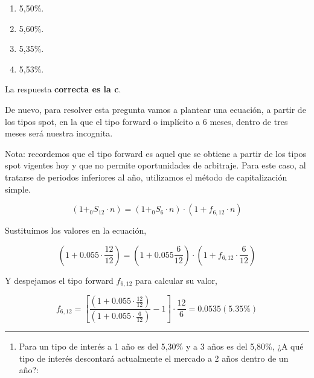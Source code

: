 \documentclass[
  letterpaper,
  DIV=11,
  numbers=noendperiod]{scrreprt}
\providecommand{\tightlist}{%
  \setlength{\itemsep}{0pt}\setlength{\parskip}{0pt}}\usepackage{longtable,booktabs,array}
\begin{document}
\begin{enumerate}
\def\labelenumi{\alph{enumi}.}
\item
  5,50\%.
\item
  5,60\%.
\item
  5,35\%.
\item
  5,53\%.
\end{enumerate}

\begin{tcolorbox}[enhanced jigsaw, left=2mm, opacityback=0, colback=white, breakable, arc=.35mm, bottomrule=.15mm, rightrule=.15mm, toprule=.15mm, leftrule=.75mm, colframe=quarto-callout-tip-color-frame]
\begin{minipage}[t]{5.5mm}
\textcolor{quarto-callout-tip-color}{\faLightbulb}
\end{minipage}%
\begin{minipage}[t]{\textwidth - 5.5mm}

La respuesta \textbf{correcta es la c}.

De nuevo, para resolver esta pregunta vamos a plantear una ecuación, a
partir de los tipos spot, en la que el tipo forward o implícito a 6
meses, dentro de tres meses será nuestra incognita.

Nota: recordemos que el tipo forward es aquel que se obtiene a partir de
los tipos spot vigentes hoy y que no permite oportunidades de arbitraje.
Para este caso, al tratarse de periodos inferiores al año, utilizamos el
método de capitalización simple.

\[(1+_{0}S_{12} \cdot {n})=(1+_{0}S_{6} \cdot n)\cdot(1+f_{6,12}\cdot {n})\]

Sustituimos los valores en la ecuación,

\[(1+0.055\cdot \frac{12}{12})=(1+0.055\frac{6}{12})\cdot(1+f_{6,12}\cdot \frac{6}{12})\]

Y despejamos el tipo forward \(f_{6,12}\) para calcular su valor,

\[f_{6,12}=\left[\frac{(1+0.055\cdot \frac{12}{12})}{(1+0.055\cdot \frac{6}{12})}-1\right]\cdot\frac{ 12}{6}=0.0535(5.35\%)\]

\end{minipage}%
\end{tcolorbox}

\begin{center}\rule{0.5\linewidth}{0.5pt}\end{center}

\begin{enumerate}
\def\labelenumi{\arabic{enumi}.}
\setcounter{enumi}{38}
\tightlist
\item
  Para un tipo de interés a 1 año es del 5,30\% y a 3 años es del
  5,80\%, ¿A qué tipo de interés descontará actualmente el mercado a 2
  años dentro de un año?:
\end{enumerate}
\end{document}
